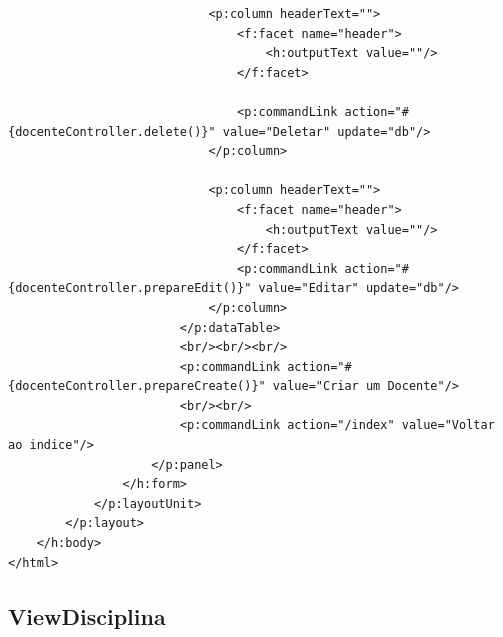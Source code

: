 \documentclass[12pt,a4paper]{article}
\begin{document}
\begin{lstlisting}
                            <p:column headerText="">
                                <f:facet name="header">
                                    <h:outputText value=""/>
                                </f:facet>

                                <p:commandLink action="#{docenteController.delete()}" value="Deletar" update="db"/>
                            </p:column>

                            <p:column headerText="">
                                <f:facet name="header">
                                    <h:outputText value=""/>
                                </f:facet>
                                <p:commandLink action="#{docenteController.prepareEdit()}" value="Editar" update="db"/>
                            </p:column>
                        </p:dataTable> 
                        <br/><br/><br/>
                        <p:commandLink action="#{docenteController.prepareCreate()}" value="Criar um Docente"/>
                        <br/><br/>
                        <p:commandLink action="/index" value="Voltar ao indice"/>
                    </p:panel>
                </h:form>
            </p:layoutUnit>
        </p:layout>
    </h:body>
</html>
\end{lstlisting}

\subsection{ViewDisciplina}
\end{document}
